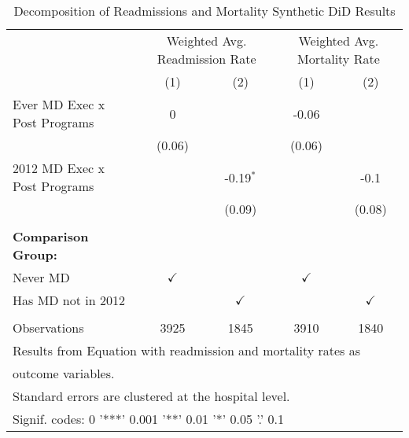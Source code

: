 \begin{table}[ht!]

\caption{\label{tab:MD_noMD_readmort_decomp_synth}Decomposition of Readmissions and Mortality Synthetic DiD Results}
\centering
\begin{tabular}[t]{lcccc}
\toprule
\multicolumn{1}{c}{ } & \multicolumn{2}{c}{Weighted Avg. Readmission Rate} & \multicolumn{2}{c}{Weighted Avg. Mortality Rate} \\
 & (1) & (2) & (1) & (2)\\
\midrule
Ever MD Exec x Post Programs & 0 &  & -0.06 & \\
 & (0.06) &  & (0.06) & \\
2012 MD Exec x Post Programs &  & -0.19$^{*}$ &  & -0.1\\
 &  & (0.09) &  & (0.08)\\
 &  &  &  & \\
\addlinespace
\textbf{Comparison Group:} &  &  &  & \\
Never MD & $\checkmark$ &  & $\checkmark$ & \\
Has MD not in 2012 &  & $\checkmark$ &  & $\checkmark$\\
 &  &  &  & \\
Observations & 3925 & 1845 & 3910 & 1840\\
\bottomrule
\multicolumn{5}{l}{\textsuperscript{} Results from Equation with readmission and mortality rates as}\\
\multicolumn{5}{l}{outcome variables.}\\
\multicolumn{5}{l}{\textsuperscript{} Standard errors are clustered at the hospital level.}\\
\multicolumn{5}{l}{\textsuperscript{} Signif. codes: 0 '***' 0.001 '**' 0.01 '*' 0.05 '.' 0.1}\\
\end{tabular}
\end{table}
